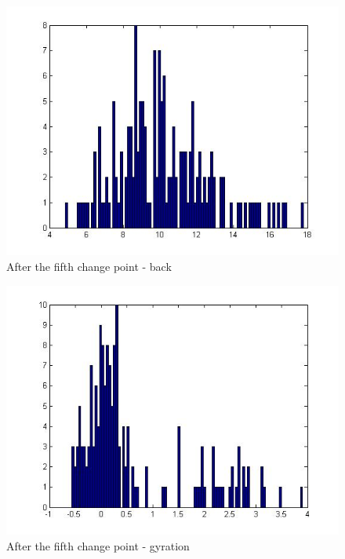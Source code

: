 \documentclass[french]{article}
\begin{document}
\begin{figure}[h]
	\includegraphics[scale=0.7]{hist2_2-back.jpg}
	\caption{After the fifth change point - back}
\end{figure}

\begin{figure}[h]
	\includegraphics[scale=0.7]{hist3_2-gyr.jpg}
	\caption{After the fifth change point - gyration}
\end{figure}
\end{document}
